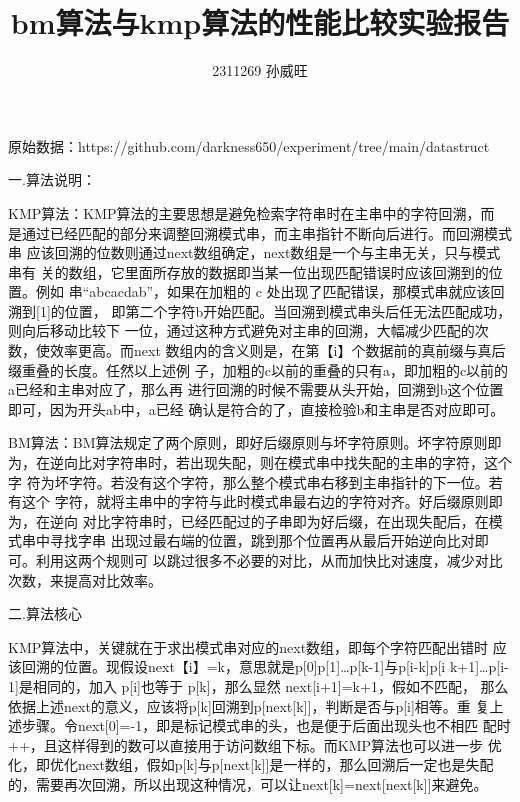 \documentclass[12pt]{article}
\title{bm算法与kmp算法的性能比较实验报告}
\author{2311269 孙威旺 }
\begin{document}
\maketitle
\begin{center}
	原始数据：https://github.com/darkness650/experiment/tree/main/datastruct
\end{center}
\begin{Large}
	\heiti
	 一.算法说明：
\end{Large}

KMP算法：KMP算法的主要思想是避免检索字符串时在主串中的字符回溯，而
是通过已经匹配的部分来调整回溯模式串，而主串指针不断向后进行。而回溯模式串
应该回溯的位数则通过next数组确定，next数组是一个与主串无关，只与模式串有
关的数组，它里面所存放的数据即当某一位出现匹配错误时应该回溯到的位置。例如
串“abcacdab”，如果在加粗的 c 处出现了匹配错误，那模式串就应该回溯到[1]的位置，
即第二个字符b开始匹配。当回溯到模式串头后任无法匹配成功，则向后移动比较下
一位，通过这种方式避免对主串的回溯，大幅减少匹配的次数，使效率更高。而next
数组内的含义则是，在第【i】个数据前的真前缀与真后缀重叠的长度。任然以上述例
子，加粗的c以前的重叠的只有a，即加粗的c以前的a已经和主串对应了，那么再
进行回溯的时候不需要从头开始，回溯到b这个位置即可，因为开头ab中，a已经
确认是符合的了，直接检验b和主串是否对应即可。 

BM算法：BM算法规定了两个原则，即好后缀原则与坏字符原则。坏字符原则即
为，在逆向比对字符串时，若出现失配，则在模式串中找失配的主串的字符，这个字
符为坏字符。若没有这个字符，那么整个模式串右移到主串指针的下一位。若有这个
字符，就将主串中的字符与此时模式串最右边的字符对齐。好后缀原则即为，在逆向
对比字符串时，已经匹配过的子串即为好后缀，在出现失配后，在模式串中寻找字串
出现过最右端的位置，跳到那个位置再从最后开始逆向比对即可。利用这两个规则可
以跳过很多不必要的对比，从而加快比对速度，减少对比次数，来提高对比效率。

\begin{Large}
	{\noindent
		\heiti
二.算法核心 } 
\end{Large}

KMP算法中，关键就在于求出模式串对应的next数组，即每个字符匹配出错时
应该回溯的位置。现假设next【i】=k，意思就是p[0]p[1]…p[k-1]与p[i-k]p[i
k+1]…p[i-1]是相同的，加入 p[i]也等于 p[k]，那么显然 next[i+1]=k+1，假如不匹配，
那么依据上述next的意义，应该将p[k]回溯到p[next[k]]，判断是否与p[i]相等。重
复上述步骤。令next[0]=-1，即是标记模式串的头，也是便于后面出现头也不相匹
配时++，且这样得到的数可以直接用于访问数组下标。而KMP算法也可以进一步
优化，即优化next数组，假如p[k]与p[next[k]]是一样的，那么回溯后一定也是失配
的，需要再次回溯，所以出现这种情况，可以让next[k]=next[next[k]]来避免。 
\end{document}
